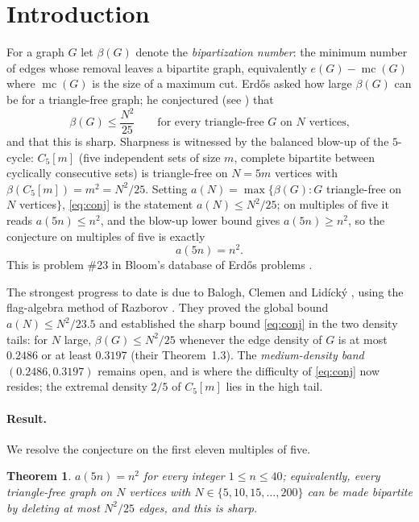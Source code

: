 \documentclass[11pt]{article}
\newtheorem{theorem}{Theorem}[section]
\theoremstyle{remark}
\DeclareMathOperator{\mc}{mc}
\newcommand{\bip}{\beta}
\begin{document}
\section{Introduction}

For a graph $G$ let $\bip(G)$ denote the \emph{bipartization number}: the minimum
number of edges whose removal leaves a bipartite graph, equivalently
$e(G)-\mc(G)$ where $\mc(G)$ is the size of a maximum cut. Erd\H{o}s asked how
large $\bip(G)$ can be for a triangle-free graph; he conjectured (see \cite{Bl23})
that
\begin{equation}\label{eq:conj}
\bip(G)\le \frac{N^2}{25}\qquad\text{for every triangle-free }G\text{ on }N\text{ vertices,}
\end{equation}
and that this is sharp. Sharpness is witnessed by the balanced blow-up of the
$5$-cycle: $C_5[m]$ (five independent sets of size $m$, complete bipartite between
cyclically consecutive sets) is triangle-free on $N=5m$ vertices with
$\bip(C_5[m])=m^2=N^2/25$. Setting $a(N)=\max\{\bip(G):G$ triangle-free on $N$
vertices$\}$, \eqref{eq:conj} is the statement $a(N)\le N^2/25$; on multiples of
five it reads $a(5n)\le n^2$, and the blow-up lower bound gives $a(5n)\ge n^2$, so
the conjecture on multiples of five is exactly
\[
a(5n)=n^2.
\]
This is problem \#23 in Bloom's database of Erd\H{o}s problems \cite{Bl23}.

The strongest progress to date is due to Balogh, Clemen and Lid\'ick\'y
\cite{BCL21}, using the flag-algebra method of Razborov \cite{Raz07}. They proved
the global bound $a(N)\le N^2/23.5$ and established the sharp bound \eqref{eq:conj}
in the two density tails: for $N$ large, $\bip(G)\le N^2/25$ whenever the edge
density of $G$ is at most $0.2486$ or at least $0.3197$ (their Theorem~1.3). The
\emph{medium-density band} $(0.2486,0.3197)$ remains open, and is where the
difficulty of \eqref{eq:conj} now resides; the extremal density $2/5$ of $C_5[m]$
lies in the high tail.

\paragraph{Result.} We resolve the conjecture on the first eleven multiples of five.

\begin{theorem}\label{thm:main}
$a(5n)=n^2$ for every integer $1\le n\le 40$; equivalently, every triangle-free
graph on $N$ vertices with $N\in\{5,10,15,\dots,200\}$ can be made bipartite by
deleting at most $N^2/25$ edges, and this is sharp.
\end{theorem}
\end{document}
